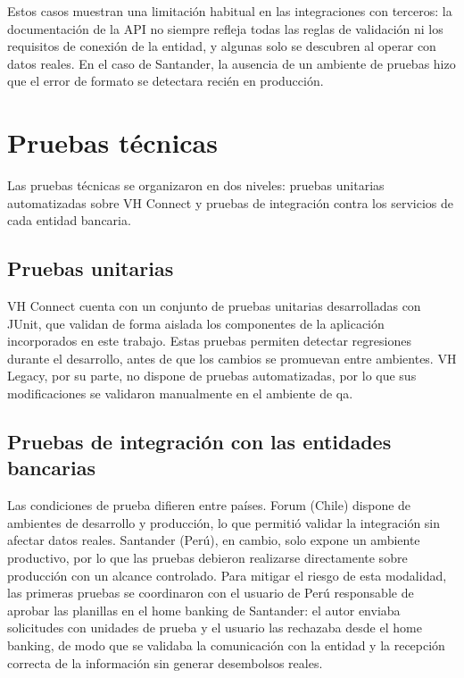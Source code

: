 Estos casos muestran una limitación habitual en las integraciones con terceros: la documentación de la API no siempre refleja todas las reglas de validación ni los requisitos de conexión de la entidad, y algunas solo se descubren al operar con datos reales. En el caso de Santander, la ausencia de un ambiente de pruebas hizo que el error de formato se detectara recién en producción.

\section{Pruebas técnicas}

Las pruebas técnicas se organizaron en dos niveles: pruebas unitarias automatizadas sobre VH Connect y pruebas de integración contra los servicios de cada entidad bancaria.

\subsection{Pruebas unitarias}

VH Connect cuenta con un conjunto de pruebas unitarias desarrolladas con JUnit, que validan de forma aislada los componentes de la aplicación incorporados en este trabajo. Estas pruebas permiten detectar regresiones durante el desarrollo, antes de que los cambios se promuevan entre ambientes. VH Legacy, por su parte, no dispone de pruebas automatizadas, por lo que sus modificaciones se validaron manualmente en el ambiente de qa.

\subsection{Pruebas de integración con las entidades bancarias}

Las condiciones de prueba difieren entre países. Forum (Chile) dispone de ambientes de desarrollo y producción, lo que permitió validar la integración sin afectar datos reales. Santander (Perú), en cambio, solo expone un ambiente productivo, por lo que las pruebas debieron realizarse directamente sobre producción con un alcance controlado. Para mitigar el riesgo de esta modalidad, las primeras pruebas se coordinaron con el usuario de Perú responsable de aprobar las planillas en el home banking de Santander: el autor enviaba solicitudes con unidades de prueba y el usuario las rechazaba desde el home banking, de modo que se validaba la comunicación con la entidad y la recepción correcta de la información sin generar desembolsos reales.

